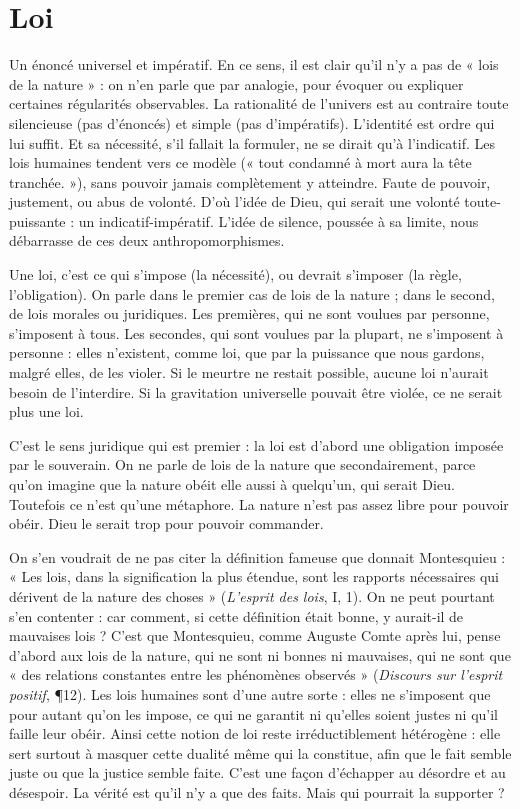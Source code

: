 
\section{Loi}
Un énoncé universel et impératif. En ce sens, il est clair qu’il n’y a pas
de « lois de la nature » : on n’en parle que par analogie, pour évoquer
ou expliquer certaines régularités observables. La rationalité de l’univers est au
contraire toute silencieuse (pas d’énoncés) et simple (pas d’impératifs). L’identité
est ordre qui lui suffit. Et sa nécessité, s’il fallait la formuler, ne se dirait
qu’à l’indicatif. Les lois humaines tendent vers ce modèle (« tout condamné à
mort aura la tête tranchée. »), sans pouvoir jamais complètement y atteindre.
Faute de pouvoir, justement, ou abus de volonté. D’où l’idée de Dieu, qui
serait une volonté toute-puissante : un indicatif-impératif. L’idée de silence,
poussée à sa limite, nous débarrasse de ces deux anthropomorphismes.

Une loi, c’est ce qui s’impose (la nécessité), ou devrait s'imposer (la règle,
l'obligation). On parle dans le premier cas de lois de la nature ; dans le second,
de lois morales ou juridiques. Les premières, qui ne sont voulues par personne,
s'imposent à tous. Les secondes, qui sont voulues par la plupart, ne s'imposent
à personne : elles n’existent, comme loi, que par la puissance que nous gardons,
malgré elles, de les violer. Si le meurtre ne restait possible, aucune loi n’aurait
besoin de l’interdire. Si la gravitation universelle pouvait être violée, ce ne serait
plus une loi.

C’est le sens juridique qui est premier : la loi est d’abord une obligation
imposée par le souverain. On ne parle de lois de la nature que secondairement,
parce qu’on imagine que la nature obéit elle aussi à quelqu'un, qui serait Dieu.
Toutefois ce n’est qu’une métaphore. La nature n’est pas assez libre pour pouvoir
obéir. Dieu le serait trop pour pouvoir commander.

On s’en voudrait de ne pas citer la définition fameuse que donnait
Montesquieu : « Les lois, dans la signification la plus étendue, sont les rapports
nécessaires qui dérivent de la nature des choses » ({\it L'esprit des lois}, I, 1). On ne
peut pourtant s’en contenter : car comment, si cette définition était bonne, y
aurait-il de mauvaises lois ? C’est que Montesquieu, comme Auguste Comte
après lui, pense d’abord aux lois de la nature, qui ne sont ni bonnes ni mauvaises,
qui ne sont que « des relations constantes entre les phénomènes
observés » ({\it Discours sur l'esprit positif}, \P 12). Les lois humaines sont d’une autre
sorte : elles ne s’imposent que pour autant qu’on les impose, ce qui ne garantit
ni qu’elles soient justes ni qu’il faille leur obéir. Ainsi cette notion de loi reste
irréductiblement hétérogène : elle sert surtout à masquer cette dualité même
qui la constitue, afin que le fait semble juste ou que la justice semble faite. C’est
une façon d’échapper au désordre et au désespoir. La vérité est qu’il n’y a que
des faits. Mais qui pourrait la supporter ?

